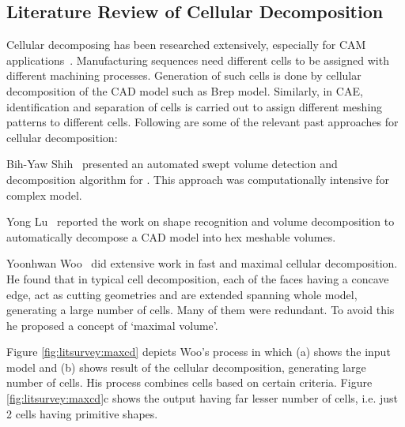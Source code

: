 

\subsection{Literature Review of Cellular Decomposition}

Cellular decomposing has been researched extensively, especially for CAM applications~\cite{Ma2009}. Manufacturing sequences need different cells to be assigned with different machining processes. Generation of such cells is done by cellular decomposition of the CAD model such as Brep model. Similarly, in CAE, identification and separation of cells is carried out to assign different meshing patterns to different cells. Following are some of the relevant past approaches for cellular decomposition:

Bih-Yaw Shih~\cite{Shih1996} presented an automated swept volume detection and decomposition algorithm for . This approach was computationally intensive for complex model. 

Yong Lu~\cite{LuGadhTautges2001} reported the work on shape recognition and volume decomposition to automatically decompose a CAD model into hex meshable volumes. 

Yoonhwan Woo~\cite{Woo2002, Woo2003, Woo2003a, Woo2006, Woo2009}  did extensive work in fast and maximal cellular decomposition. He found that in typical cell decomposition, each of the faces having a concave edge, act as cutting geometries and are extended spanning whole model, generating a large number of cells. Many of them were redundant. To avoid this he proposed a concept of `maximal volume'. 

Figure \ref{fig:litsurvey:maxcd} depicts Woo's process in which (a) shows the input model and (b) shows result of the cellular decomposition, generating large number of cells. His process combines cells based on certain criteria. Figure \ref{fig:litsurvey:maxcd}c shows the output having far lesser number of cells, i.e. just 2 cells having primitive shapes. 
 
 
